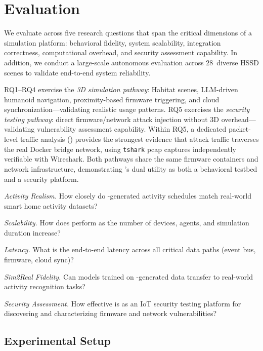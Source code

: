 \section{Evaluation}\label{sec:eval}

We evaluate \sys{} across five research questions that span the
critical dimensions of a simulation platform: behavioral fidelity,
system scalability, integration correctness, computational
overhead, and security assessment capability.  In addition, we
conduct a large-scale autonomous evaluation across 28~diverse HSSD
scenes to validate end-to-end system reliability.

RQ1--RQ4 exercise the \emph{3D simulation pathway}: Habitat scenes,
LLM-driven humanoid navigation, proximity-based firmware triggering,
and cloud synchronization---validating realistic usage patterns.
RQ5 exercises the \emph{security testing pathway}: direct
firmware/network attack injection without 3D overhead---validating
vulnerability assessment capability.  Within RQ5, a dedicated
packet-level traffic analysis () provides the
strongest evidence that attack traffic traverses the real Docker
bridge network, using \texttt{tshark} pcap captures independently
verifiable with Wireshark.
Both pathways share the same firmware containers and network
infrastructure, demonstrating \sys{}'s dual utility as both a
behavioral testbed and a security platform.

\begin{description}[leftmargin=*]
  \item[RQ1] \emph{Activity Realism.}
    How closely do \sys{}-generated activity schedules match
    real-world smart home activity datasets?
  \item[RQ2] \emph{Scalability.}
    How does \sys{} perform as the number of devices, agents,
    and simulation duration increase?
  \item[RQ3] \emph{Latency.}
    What is the end-to-end latency across all critical data
    paths (event bus, firmware, cloud sync)?
  \item[RQ4] \emph{Sim2Real Fidelity.}
    Can models trained on \sys{}-generated data transfer to
    real-world activity recognition tasks?
  \item[RQ5] \emph{Security Assessment.}
    How effective is \sys{} as an IoT security testing platform
    for discovering and characterizing firmware and network
    vulnerabilities?
\end{description}

\subsection{Experimental Setup}

